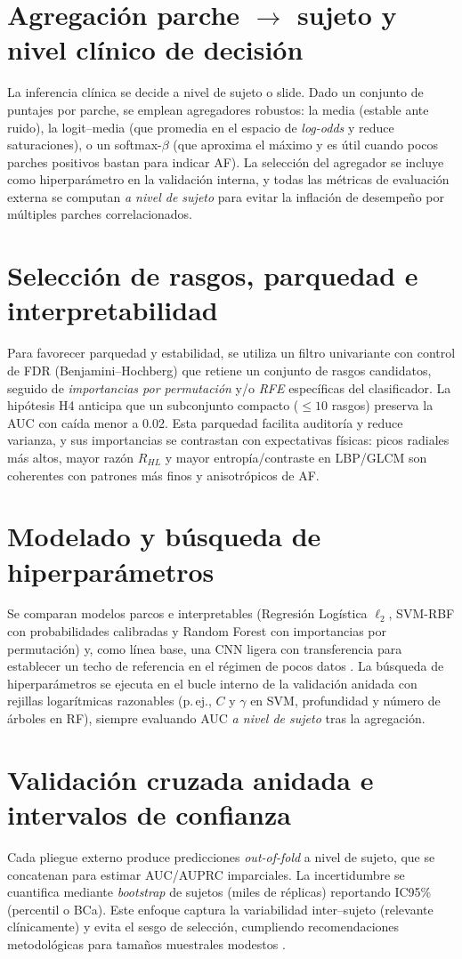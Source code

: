 \section*{Agregación parche $\rightarrow$ sujeto y nivel clínico de decisión}
La inferencia clínica se decide a nivel de sujeto o slide. Dado un conjunto de puntajes por parche, se emplean agregadores robustos: la media (estable ante ruido), la logit–media (que promedia en el espacio de \emph{log-odds} y reduce saturaciones), o un softmax-$\beta$ (que aproxima el máximo y es útil cuando pocos parches positivos bastan para indicar AF). La selección del agregador se incluye como hiperparámetro en la validación interna, y todas las métricas de evaluación externa se computan \emph{a nivel de sujeto} para evitar la inflación de desempeño por múltiples parches correlacionados.

\section*{Selección de rasgos, parquedad e interpretabilidad}
Para favorecer parquedad y estabilidad, se utiliza un filtro univariante con control de FDR (Benjamini–Hochberg) que retiene un conjunto de rasgos candidatos, seguido de \emph{importancias por permutación} y/o \emph{RFE} específicas del clasificador. La hipótesis H4 anticipa que un subconjunto compacto ($\leq 10$ rasgos) preserva la AUC con caída menor a 0.02. Esta parquedad facilita auditoría y reduce varianza, y sus importancias se contrastan con expectativas físicas: picos radiales más altos, mayor razón $R_{HL}$ y mayor entropía/contraste en LBP/GLCM son coherentes con patrones más finos y anisotrópicos de AF.

\section*{Modelado y búsqueda de hiperparámetros}
Se comparan modelos parcos e interpretables (Regresión Logística $\ell_2$, SVM-RBF con probabilidades calibradas y Random Forest con importancias por permutación) y, como línea base, una CNN ligera con transferencia para establecer un techo de referencia en el régimen de pocos datos \cite{Alzubaidi2020Electronics}. La búsqueda de hiperparámetros se ejecuta en el bucle interno de la validación anidada con rejillas logarítmicas razonables (p.\,ej., $C$ y $\gamma$ en SVM, profundidad y número de árboles en RF), siempre evaluando AUC \emph{a nivel de sujeto} tras la agregación.

\section*{Validación cruzada anidada e intervalos de confianza}
Cada pliegue externo produce predicciones \emph{out-of-fold} a nivel de sujeto, que se concatenan para estimar AUC/AUPRC imparciales. La incertidumbre se cuantifica mediante \emph{bootstrap} de sujetos (miles de réplicas) reportando IC95\% (percentil o BCa). Este enfoque captura la variabilidad inter–sujeto (relevante clínicamente) y evita el sesgo de selección, cumpliendo recomendaciones metodológicas para tamaños muestrales modestos \cite{Tsamardinos2022Patterns}.

